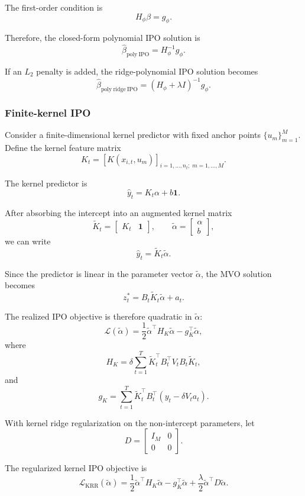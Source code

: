 \documentclass{article}
\begin{document}
The first-order condition is
\[
H_{\phi}\beta = g_{\phi}.
\]

Therefore, the closed-form polynomial IPO solution is
\[
\boxed{
\hat\beta_{\mathrm{poly\ IPO}}
=
H_{\phi}^{-1}g_{\phi}.
}
\]

If an \(L_2\) penalty is added, the ridge-polynomial IPO solution becomes
\[
\boxed{
\hat\beta_{\mathrm{poly\ ridge\ IPO}}
=
(H_{\phi}+\lambda I)^{-1}g_{\phi}.
}
\]

\subsubsection{Finite-kernel IPO}

Consider a finite-dimensional kernel predictor with fixed anchor points
\(\{u_m\}_{m=1}^M\). Define the kernel feature matrix
\[
K_t
=
\left[
K(x_{i,t}, u_m)
\right]_{i=1,\ldots,n_t;\;m=1,\ldots,M}.
\]

The kernel predictor is
\[
\hat y_t = K_t \alpha + b\mathbf 1.
\]

After absorbing the intercept into an augmented kernel matrix
\[
\widetilde K_t =
\begin{bmatrix}
K_t & \mathbf 1
\end{bmatrix},
\qquad
\widetilde \alpha =
\begin{bmatrix}
\alpha\\
b
\end{bmatrix},
\]
we can write
\[
\hat y_t = \widetilde K_t\widetilde \alpha.
\]

Since the predictor is linear in the parameter vector
\(\widetilde\alpha\), the MVO solution becomes
\[
z_t^*
=
B_t\widetilde K_t\widetilde\alpha + a_t.
\]

The realized IPO objective is therefore quadratic in
\(\widetilde\alpha\):
\[
\mathcal L(\widetilde\alpha)
=
\frac{1}{2}
\widetilde\alpha^\top H_K \widetilde\alpha
-
g_K^\top \widetilde\alpha,
\]
where
\[
H_K
=
\delta
\sum_{t=1}^T
\widetilde K_t^\top B_t^\top V_t B_t \widetilde K_t,
\]
and
\[
g_K
=
\sum_{t=1}^T
\widetilde K_t^\top B_t^\top
\left(
y_t - \delta V_t a_t
\right).
\]

With kernel ridge regularization on the non-intercept parameters, let
\[
D =
\begin{bmatrix}
I_M & 0\\
0 & 0
\end{bmatrix}.
\]

The regularized kernel IPO objective is
\[
\mathcal L_{\mathrm{KRR}}(\widetilde\alpha)
=
\frac{1}{2}
\widetilde\alpha^\top H_K \widetilde\alpha
-
g_K^\top \widetilde\alpha
+
\frac{\lambda}{2}
\widetilde\alpha^\top D\widetilde\alpha.
\]
\end{document}
